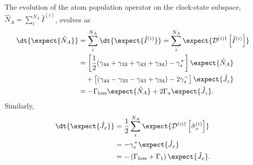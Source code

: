 The evolution of the atom population operator on the clock-state subspace, $ \hat{N}_A=\sum_i^{N_A}\hat{I}^{(i)} $, evolves as
\begin{align}
\dt{\expect{\hat{N}_A}} &= \sum_i^{N_A} \dt{ \expect{\hat{I}^{(i)}}}  =\sum_i^{N_A} \expect{\mathcal{D}^{(i)\dagger}\left[\hat{I}^{(i)}\right] }\\
&= \left[\frac{1}{2}(\gamma_{44}+\gamma_{33}+\gamma_{43}+\gamma_{34}) -\gamma_s^+\right]\expect{\hat{N}_A} \nonumber \\
&\quad + \left[(\gamma_{44}-\gamma_{33}-\gamma_{43}+\gamma_{34}) -2\gamma_s^- \right] \expect{\hat{J}_z}\\
&= -\Gamma_{\rm loss}\expect{\hat{N}_A} +2\Gamma_a \expect{\hat{J}_z}. \label{Eq:NAt}
\end{align}
Similarly, 
\begin{align}
\dt{\expect{\hat{J}_x}} &= \frac{1}{2} \sum_i^{N_A} \expect{\mathcal{D}^{(i)\dagger}\left[\hat{\sigma}_x^{(i)} \right] }\\
&= -\gamma_s^+\expect{\hat{J}_x}\\
&= -\left(\Gamma_{\rm loss} +\Gamma_1 \right)\expect{\hat{J}_x} .
\end{align}


